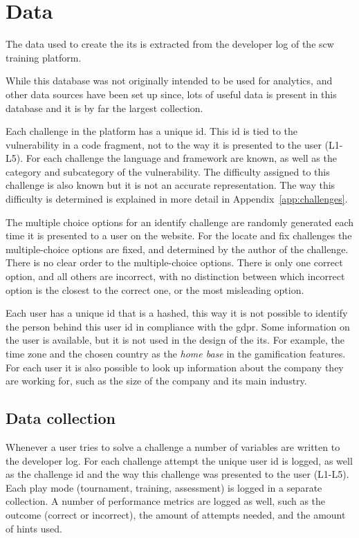 \section{Data}
\label{sec:data}

The data used to create the \gls{its} is extracted from the developer log of the \gls{scw} training platform.

While this database was not originally intended to be used for analytics, and other data sources have been set up since, lots of useful data is present in this database and it is by far the largest collection. 

Each challenge in the platform has a unique \gls{id}.
This \gls{id} is tied to the \gls{vulnerability} in a code fragment, not to the way it is presented to the user (L1-L5).
For each challenge the language and framework are known, as well as the category and subcategory of the vulnerability.
The difficulty assigned to this challenge is also known but it is not an accurate representation.
The way this difficulty is determined is explained in more detail in Appendix~\ref{app:challenges}.

The multiple choice options for an identify challenge are randomly generated each time it is presented to a user on the website.
For the locate and fix challenges the multiple-choice options are fixed, and determined by the author of the challenge.
There is no clear order to the multiple-choice options.
There is only one correct option, and all others are incorrect, with no distinction between which incorrect option is the closest to the correct one, or the most misleading option.

Each user has a unique \gls{id} that is a hashed, this way it is not possible to identify the person behind this user \gls{id} in compliance with the \gls{gdpr}.
Some information on the user is available, but it is not used in the design of the \gls{its}.
For example, the time zone and the chosen country as the \textit{home base} in the gamification features.
For each user it is also possible to look up information about the company they are working for, such as the size of the company and its main industry.

\subsection{Data collection}
Whenever a user tries to solve a challenge a number of variables are written to the developer log.
For each challenge attempt the unique user id is logged, as well as the challenge id and the way this challenge was presented to the user (L1-L5).
Each play mode (tournament, training, assessment) is logged in a separate collection.
A number of performance metrics are logged as well, such as the outcome (correct or incorrect), the amount of attempts needed, and the amount of hints used.

